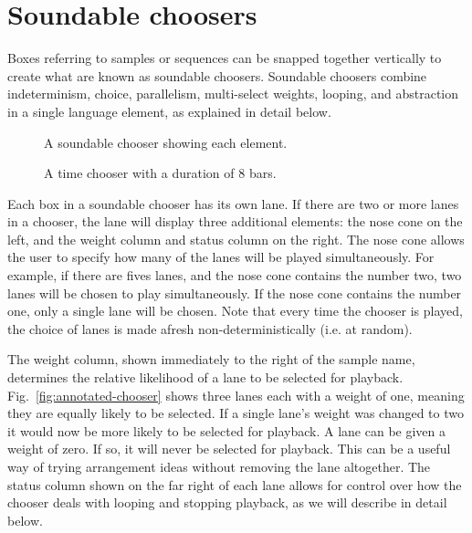 \documentclass[runningheads,a4paper]{llncs}
\begin{document}
\section{Soundable choosers}\label{choosers}

Boxes referring to samples or sequences can be snapped together vertically to create what are known as soundable choosers. Soundable choosers combine indeterminism, choice, parallelism, multi-select weights, looping, and abstraction in a single language element, as explained in detail below.

\begin{figure}[!h]
	\begin{floatrow}
	{\caption{A soundable chooser showing each
		element.}\label{fig:annotated-chooser}}
	{\caption{A time chooser with a duration of 8
		bars.}\label{fig:time-chooser}}
	\end{floatrow}
\end{figure}


Each box in a soundable chooser has its own lane. If there are two or more lanes in a chooser, the lane will display three additional elements: the nose cone on the left, and the weight column and status column on the right. The nose cone allows the user to specify how many of the lanes will be played simultaneously. For example, if there are fives lanes, and the nose cone contains the number two, two lanes will be chosen to play simultaneously.  If the nose cone contains the number one, only a single lane will be chosen. Note that every time the chooser is played, the choice of lanes is made afresh non-deterministically (i.e. at random).
 
The weight column, shown immediately to the right of the sample name, determines the relative likelihood of a lane to be selected for playback. Fig.~\ref{fig:annotated-chooser} shows three lanes each with a weight of one, meaning they are equally likely to be selected. If a single lane's weight was changed to two it would now be more likely to be selected for playback. A lane can be given a weight of zero. If so, it will never be selected for playback. This can be a useful way of trying arrangement ideas without removing the lane altogether. The status column shown on the far right of each lane allows for control over how the chooser deals with looping and stopping playback, as we will describe in detail below. 
 
\end{document}
